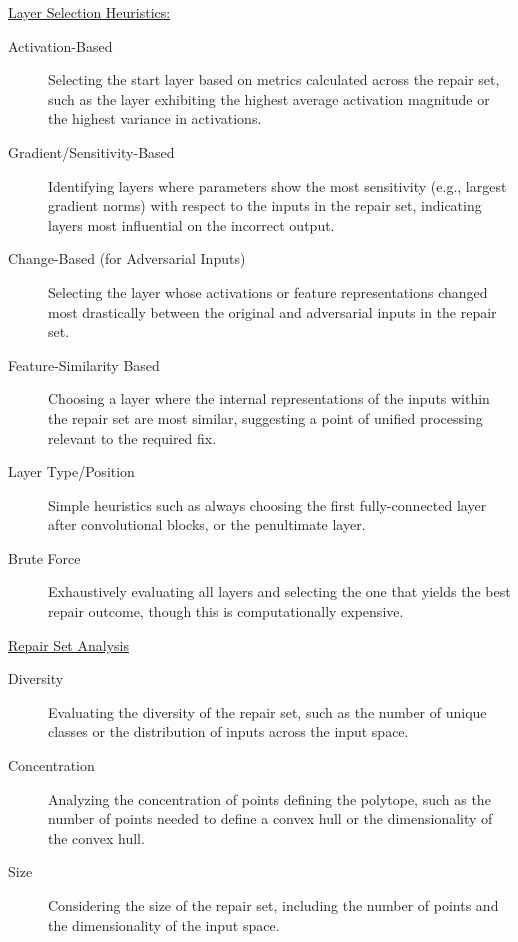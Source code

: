 \documentclass{article}
\begin{document}
\underline{Layer Selection Heuristics:}
\begin{description}
	\item[Activation-Based] Selecting the start layer based on metrics calculated across the repair set, such as the layer exhibiting the highest average activation magnitude or the highest variance in activations.
	\item[Gradient/Sensitivity-Based] Identifying layers where parameters show the most sensitivity (e.g., largest gradient norms) with respect to the inputs in the repair set, indicating layers most influential on the incorrect output.
	\item[Change-Based (for Adversarial Inputs)] Selecting the layer whose activations or feature representations changed most drastically between the original and adversarial inputs in the repair set.
	\item[Feature-Similarity Based] Choosing a layer where the internal representations of the inputs within the repair set are most similar, suggesting a point of unified processing relevant to the required fix.
	\item[Layer Type/Position] Simple heuristics such as always choosing the first fully-connected layer after convolutional blocks, or the penultimate layer.
	\item[Brute Force] Exhaustively evaluating all layers and selecting the one that yields the best repair outcome, though this is computationally expensive.
\end{description}

\underline{Repair Set Analysis}
\begin{description}
	\item[Diversity] Evaluating the diversity of the repair set, such as the number of unique classes or the distribution of inputs across the input space.
	\item[Concentration] Analyzing the concentration of points defining the polytope, such as the number of points needed to define a convex hull or the dimensionality of the convex hull.
	\item[Size] Considering the size of the repair set, including the number of points and the dimensionality of the input space.
\end{description}

\end{document}
